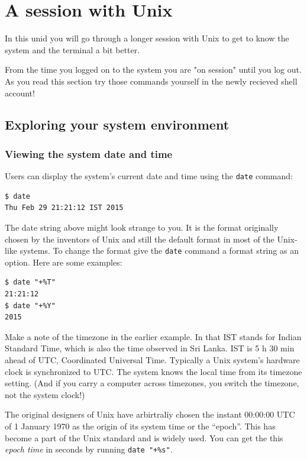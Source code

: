 \documentclass[11pt,a4paper,twoside]{article}
\begin{document}
\newpage

\section{A session with Unix}

In this unid you will go through a longer session with Unix to get to 
know the system and the terminal a bit better.

From the time you logged on to the system you are "on session" until you
log out. As you read this section try those commands yourself in the newly 
recieved shell account!

\subsection{Exploring your system environment}

\subsubsection{Viewing the system date and time}

Users can display the system's current date and time using the \texttt{date} 
command:
\begin{lstlisting}[frame=single]
$ date
Thu Feb 29 21:21:12 IST 2015
\end{lstlisting}

The date string above might look strange to you. It is the format originally
chosen by the inventors of Unix and still the default format in most of the
Unix-like systems. To change the format give the \texttt{date} command a 
format string as an option. Here are some examples:

\begin{lstlisting}[frame=single]
$ date "+%T"
21:21:12
$ date "+%Y"
2015
\end{lstlisting}

Make a note of the timezone in the earlier example. In that IST stands for 
Indian Standard Time, which is also the time observed in Sri Lanka. IST is 
5 h 30 min ahead of UTC, Coordinated Universal Time. Typically a Unix system's
hardware clock is synchronized to UTC. The system knows the local time from 
its timezone setting. (And if you carry a computer across timezones, you 
switch the timezone, not the system clock!)

The original designers of Unix have arbirtraliy chosen the instant
00:00:00 UTC of 1 January 1970 as the origin of its system time or the 
``epoch''. This has become a part of the Unix standard and is widely 
used. You can get the this \emph{epoch time} in seconds by running 
\texttt{date "+\%s"}.
\end{document}
